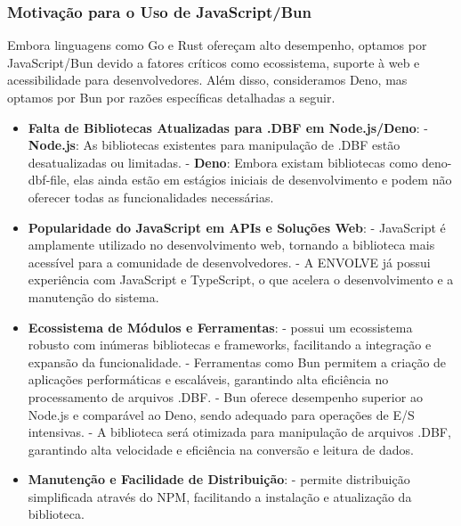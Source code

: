 \begin{titlepage}
    \subsubsection{Motivação para o Uso de JavaScript/Bun}
    Embora linguagens como Go e Rust ofereçam alto desempenho, optamos por
    JavaScript/Bun devido a fatores críticos como ecossistema, suporte à web e
    acessibilidade para desenvolvedores. Além disso, consideramos Deno, mas optamos
    por Bun por razões específicas detalhadas a seguir.
    \begin{itemize}
        \item \textbf{Falta de Bibliotecas Atualizadas para .DBF em Node.js/Deno}:
              \subitem - \textbf{Node.js}: As bibliotecas existentes para manipulação de .DBF estão desatualizadas ou limitadas.
              \subitem - \textbf{Deno}: Embora existam bibliotecas como deno-dbf-file, elas ainda estão em estágios iniciais de desenvolvimento e podem não oferecer todas as funcionalidades necessárias.
        \item \textbf{Popularidade do JavaScript em APIs e Soluções Web}:
              \subitem - JavaScript é amplamente utilizado no desenvolvimento web, tornando a biblioteca mais acessível para a comunidade de desenvolvedores.
              \subitem - A ENVOLVE já possui experiência com JavaScript e TypeScript, o que acelera o desenvolvimento e a manutenção do sistema. 
        \item \textbf{Ecossistema de Módulos e Ferramentas}:
              \subitem - possui um ecossistema robusto com inúmeras bibliotecas e frameworks, facilitando a integração e expansão da funcionalidade.
              \subitem - Ferramentas como Bun permitem a criação de aplicações performáticas e escaláveis, garantindo alta eficiência no processamento de arquivos .DBF.
              \subitem - Bun oferece desempenho superior ao Node.js e comparável ao Deno, sendo adequado para operações de E/S intensivas.
              \subitem - A biblioteca será otimizada para manipulação de arquivos .DBF, garantindo alta velocidade e eficiência na conversão e leitura de dados.
        \item  \textbf{Manutenção e Facilidade de Distribuição}:
              \subitem - permite distribuição simplificada através do NPM, facilitando a instalação e atualização da biblioteca.
    \end{itemize}


\end{titlepage}
